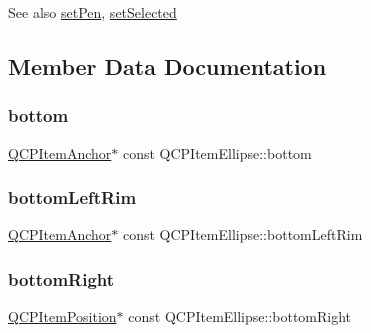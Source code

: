 \begin{DoxySeeAlso}{See also}
\hyperlink{class_q_c_p_item_ellipse_adb81a663ed2420fcfa011e49f678d1a6}{set\+Pen}, \hyperlink{class_q_c_p_abstract_item_a203de94ad586cc44d16c9565f49d3378}{set\+Selected} 
\end{DoxySeeAlso}


\subsection{Member Data Documentation}
\mbox{\label{class_q_c_p_item_ellipse_a2dc80ff9f5db600eae0133bdde65066f}} 
\subsubsection{\texorpdfstring{bottom}{bottom}}
{\footnotesize\ttfamily \hyperlink{class_q_c_p_item_anchor}{Q\+C\+P\+Item\+Anchor}$\ast$ const Q\+C\+P\+Item\+Ellipse\+::bottom}

\mbox{\label{class_q_c_p_item_ellipse_a31f31a9e9f9098c90fb47573094276c5}} 
\subsubsection{\texorpdfstring{bottom\+Left\+Rim}{bottomLeftRim}}
{\footnotesize\ttfamily \hyperlink{class_q_c_p_item_anchor}{Q\+C\+P\+Item\+Anchor}$\ast$ const Q\+C\+P\+Item\+Ellipse\+::bottom\+Left\+Rim}

\mbox{\label{class_q_c_p_item_ellipse_ab73c8deafc0d8d1ef7d75b6cdcc37159}} 
\subsubsection{\texorpdfstring{bottom\+Right}{bottomRight}}
{\footnotesize\ttfamily \hyperlink{class_q_c_p_item_position}{Q\+C\+P\+Item\+Position}$\ast$ const Q\+C\+P\+Item\+Ellipse\+::bottom\+Right}

